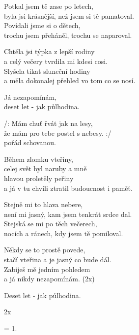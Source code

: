
\vspace{-2pt}
\ve{}
Potkal jsem tě zase po letech,\\
byla jsi krásnější, než jsem si tě pamatoval.\\
Povídali jsme si o dětech,\\
trochu jsem přeháněl, trochu se naparoval.

\vspace{-2pt}
\ve{}
Chtěla jsi týpka z lepší rodiny\\
a celý večery tvrdila mi kdesi cosi.\\
Slyšela tikat sluneční hodiny\\
a měla dokonalej přehled vo tom co se nosí.

\vspace{-2pt}
Já nezapomínám,\\
deset let - jak půlhodina.

/: Mám chuť řvát jak na lesy,\\
že mám pro tebe postel s nebesy. :/\\
pořád schovanou.

\vspace{-2pt}
\ve{}
Během zlomku vteřiny,\\
celej svět byl naruby a mně\\
hlavou proletěly peřiny\\
a já v tu chvíli ztratil budoucnost i paměť.

\vspace{-2pt}
\ve{}
Stejně mi to hlava nebere,\\
není mi jasný, kam jsem tenkrát srdce dal.\\
Stejská se mi po těch večerech,\\
nocích a ránech, kdy jsem tě pomiloval.

\vspace{-2pt}

\vspace{-2pt}
Někdy se to prostě povede,\\
stačí vteřina a je jasný co bude dál.\\
Zabiješ mě jedním pohledem\\
a já nikdy nezapomínám. (2x)

\vspace{-2pt}
\re{}
Deset let - jak půlhodina.

\vspace{-2pt}
2x

\vspace{-2pt}
\ve{}
= 1.
\vspace{-2pt}
\esong